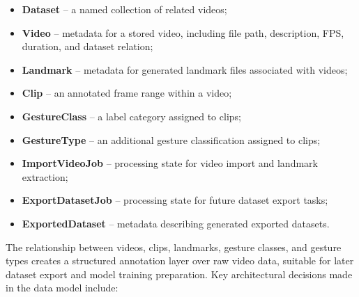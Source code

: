 \begin{itemize}
  \item \textbf{Dataset} -- a named collection of related videos;
  \item \textbf{Video} -- metadata for a stored video, including file path,
        description, FPS, duration, and dataset relation;
  \item \textbf{Landmark} -- metadata for generated landmark files associated
        with videos;
  \item \textbf{Clip} -- an annotated frame range within a video;
  \item \textbf{GestureClass} -- a label category assigned to clips;
  \item \textbf{GestureType} -- an additional gesture classification assigned
        to clips;
  \item \textbf{ImportVideoJob} -- processing state for video import and
        landmark extraction;
  \item \textbf{ExportDatasetJob} -- processing state for future dataset export
        tasks;
  \item \textbf{ExportedDataset} -- metadata describing generated exported
        datasets.
\end{itemize}

The relationship between videos, clips, landmarks, gesture classes, and gesture
types creates a structured annotation layer over raw video data, suitable for
later dataset export and model training preparation. Key architectural
decisions made in the data model include:

